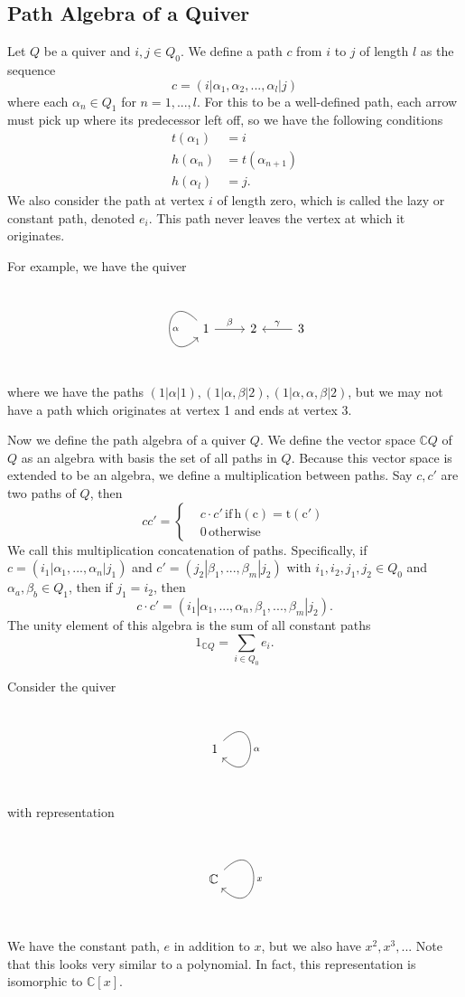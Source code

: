 \documentclass[10pt,a4paper]{report}
\begin{document}
\subsection*{Path Algebra of a Quiver}
	Let $Q$ be a quiver and $i,j\in Q_{0}$. We define a path $c$ from $i$ to $j$ of length $l$ as the sequence
	\[
		c = (i|\alpha_{1},\alpha_{2},...,\alpha_{l}|j)
	\]
	where each $\alpha_{n}\in Q_{1}$ for $n=1,...,l$. For this to be a well-defined path, each arrow must pick up where its predecessor left off, so we have the following conditions
	\begin{align*}
		t(\alpha_{1})&=i\\
		h(\alpha_{n})&=t(\alpha_{n+1})\\
		h(\alpha_{l})&=j.
	\end{align*}
	We also consider the path at vertex $i$ of length zero, which is called the lazy or constant path, denoted $e_{i}$. This path never leaves the vertex at which it originates.
	
	For example, we have the quiver
	\[
		\begin{tikzcd}
		1 \arrow[out=135,in=225,loop,"\alpha"] \arrow[r,"\beta"] & 2  & 3 \arrow[l,swap,"\gamma"]
		\end{tikzcd}
	\]
where we have the paths $(1|\alpha|1),(1|\alpha,\beta|2),(1|\alpha,\alpha,\beta|2)$, but we may not have a path which originates at vertex 1 and ends at vertex 3.

	Now we define the path algebra of a quiver $Q$. We define the vector space $\mathbb{C}Q$ of $Q$ as an algebra with basis the set of all paths in $Q$. Because this vector space is extended to be an algebra, we define a multiplication between paths. Say $c,c'$ are two paths of $Q$, then
	\[
		cc' = 
		\left\{
		\begin{aligned}
			&c\cdot c' \mathrm{\,if\,h(c)=t(c')}\\
			&0\mathrm{\,otherwise}
		\end{aligned}
		\right. 
	\]
	We call this multiplication concatenation of paths. Specifically, if $c=(i_{1}|\alpha_{1},...,\alpha_{n}|j_{1})$ and $c'=(j_{2}|\beta_{1},...,\beta_{m}|j_{2})$ with $i_{1},i_{2},j_{1},j_{2}\in Q_{0}$ and $\alpha_{a},\beta_{b}\in Q_{1}$, then if $j_{1}=i_{2}$, then 
	\[
		c\cdot c' = (i_{1}|\alpha_{1},...,\alpha_{n},\beta_{1},...,\beta_{m}|j_{2}).
	\]
	The unity element of this algebra is the sum of all constant paths
	\[
		1_{\mathbb{C}Q}=\sum_{i\in Q_{0}}e_{i}.
	\]
	
	Consider the quiver
	\[
		\begin{tikzcd}
		1 \arrow[out=45,in=315,loop,"\alpha"]
		\end{tikzcd}
	\]
	with representation
	\[
		\begin{tikzcd}
		\mathbb{C} \arrow[out=45,in=315,loop,"x"]
		\end{tikzcd}
	\]
We have the constant path, $e$ in addition to $x$, but we also have $x^{2},x^{3},..$. Note that this looks very similar to a polynomial. In fact, this representation is isomorphic to $\mathbb{C}[x]$.
\end{document}
